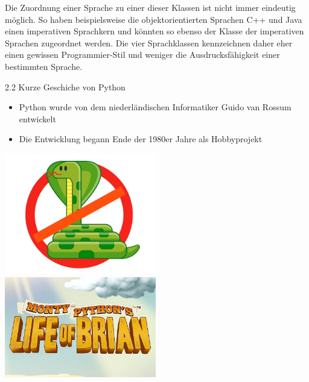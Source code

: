 \documentclass[
  11pt,
  a4paper,
  DIV=11,
  numbers=noendperiod]{scrartcl}
\providecommand{\tightlist}{%
  \setlength{\itemsep}{0pt}\setlength{\parskip}{0pt}}\usepackage{longtable,booktabs,array}
\begin{document}
Die Zuordnung einer Sprache zu einer dieser Klassen ist nicht immer
eindeutig möglich. So haben beispielsweise die objektorientierten
Sprachen C++ und Java einen imperativen Sprachkern und könnten so ebenso
der Klasse der imperativen Sprachen zugeordnet werden. Die vier
Sprachklassen kennzeichnen daher eher einen gewissen Programmier-Stil
und weniger die Ausdrucksfähigkeit einer bestimmten Sprache.

2.2 Kurze Geschiche von Python

\begin{itemize}
\tightlist
\item
  Python wurde von dem niederländischen Informatiker Guido van Rossum
  entwickelt
\item
  Die Entwicklung begann Ende der 1980er Jahre als Hobbyprojekt
\end{itemize}

\includegraphics[width=2.60417in,height=\textheight,keepaspectratio]{images/nosnake.jpg}
\includegraphics[width=2.60417in,height=\textheight,keepaspectratio]{images/montypython.jpg}
\end{document}
